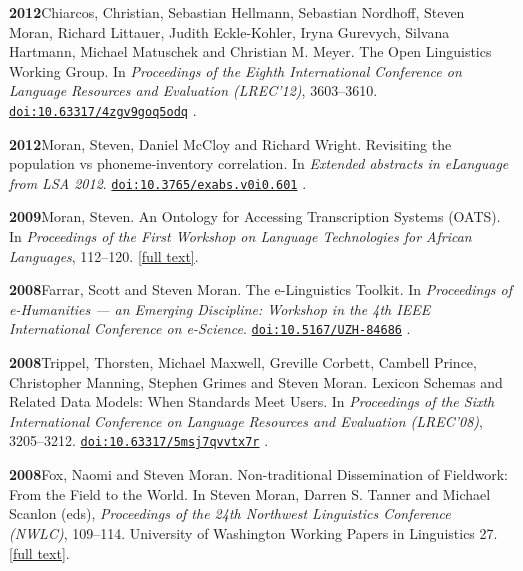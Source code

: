 \documentclass[11pt]{article}
\newcommand{\hangpara}{
 \setlength{\parindent}{0in} %
 \hangindent=0.42in %
}
\newcommand{\doi}[1]{%
  \href{https://doi.org/#1}{\nolinkurl{doi:#1}}%
}
\begin{document}
\vskip 6pt
\hangpara
{\bf 2012}\hspace{1ex}Chiarcos, Christian, Sebastian Hellmann, Sebastian Nordhoff, Steven Moran, Richard Littauer, Judith Eckle-Kohler, Iryna Gurevych, Silvana Hartmann, Michael Matuschek and Christian M. Meyer. The Open Linguistics Working Group. In {\it Proceedings of the Eighth International Conference on Language Resources and Evaluation (LREC'12)}, 3603--3610. \doi{10.63317/4zgv9goq5odq}.

\vskip 6pt
\hangpara
{\bf 2012}\hspace{1ex}Moran, Steven, Daniel McCloy and Richard Wright. Revisiting the population vs phoneme-inventory correlation. In {\it Extended abstracts in eLanguage from LSA 2012}. \doi{10.3765/exabs.v0i0.601}.

\vskip 6pt
\hangpara
{\bf 2009}\hspace{1ex}Moran, Steven. An Ontology for Accessing Transcription Systems (OATS). In {\it Proceedings of the First Workshop on Language Technologies for African Languages}, 112--120. \href{https://aclanthology.org/W09-0716/}{[full text]}.

\vskip 6pt
\hangpara
{\bf 2008}\hspace{1ex}Farrar, Scott and Steven Moran. The e-Linguistics Toolkit. In {\it Proceedings of e-Humanities --- an Emerging Discipline: Workshop in the 4th IEEE International Conference on e-Science}. \doi{10.5167/UZH-84686}.

\vskip 6pt
\hangpara
{\bf 2008}\hspace{1ex}Trippel, Thorsten, Michael Maxwell, Greville Corbett, Cambell Prince, Christopher Manning, Stephen Grimes and Steven Moran. Lexicon Schemas and Related Data Models: When Standards Meet Users. In {\it Proceedings of the Sixth International Conference on Language Resources and Evaluation (LREC'08)}, 3205--3212. \doi{10.63317/5msj7qvvtx7r}.

\vskip 6pt
\hangpara
{\bf 2008}\hspace{1ex}Fox, Naomi and Steven Moran. Non-traditional Dissemination of Fieldwork: From the Field to the World. In Steven Moran, Darren S. Tanner and Michael Scanlon (eds), {\it Proceedings of the 24th Northwest Linguistics Conference (NWLC)}, 109--114. University of Washington Working Papers in Linguistics 27. \href{https://depts.washington.edu/uwwpl/editions/vol27.html}{[full text]}.
\end{document}
